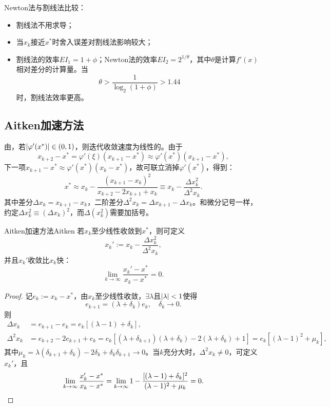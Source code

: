 \begin{remark}
    Newton法与割线法比较：
    \begin{itemize}
        \item 割线法不用求导；
        \item 当$x_k$接近$x^*$时舍入误差对割线法影响较大；
        \item 割线法的效率$EI_1 = 1 + \phi$；Newton法的效率$EI_2 = 2^{1/\theta}$，其中$\theta$是计算$f'(x)$相对差分的计算量。当
        \[
            \theta > \frac1{\log_2(1 + \phi)} > 1.44
        \]
        时，割线法效率更高。
    \end{itemize}
\end{remark}

\subsection{Aitken加速方法}

由，若$\lvert\varphi'(x^*)\rvert \in (0,1)$，则迭代收敛速度为线性的。由于
\[
    x_{k+2} - x^* = \varphi'(\xi)(x_{k+1} - x^*) \approx \varphi'(x^*)(x_{k+1} - x^*),
\]
下一项$x_{k+1} - x^* \approx \varphi'(x^*)(x_k - x^*)$，故可联立消掉$\varphi'(x^*)$，得到：
\[
    x^* \approx x_k - \frac{(x_{k+1} - x_k)^2}{x_{k+2} - 2x_{k+1} + x_k} \equiv x_k - \frac{\Delta x_k^2}{\Delta^2 x_k}.
\]
其中差分$\Delta x_k = x_{k+1} - x_k$，二阶差分$\Delta^2x_k = \Delta x_{k+1} - \Delta x_k$。和微分记号一样，约定$\Delta x_k^2 \equiv (\Delta x_k)^2$，而$\Delta(x_k^2)$需要加括号。

\begin{theorem}
    {Aitken加速方法}{Aitken}
    若$x_k$至少线性收敛到$x^*$，则可定义
    \begin{equation}
        \label{eqn:Aitken}
        x_k' := x_k - \frac{\Delta x_k^2}{\Delta^2x_k},
    \end{equation}
    并且$x_k'$收敛比$x_k$快：
    \begin{equation}\label{eq:na-aitken-acceleration}
        \lim_{k\to\infty}\frac{x_k' - x^*}{x_k - x^*} = 0.
    \end{equation}
\end{theorem}

\begin{proof}
    记$e_k := x_k - x^*$，由$x_k$至少线性收敛，$\exists\lambda$且$\lvert\lambda\rvert < 1$使得
    \[
        e_{k+1} = (\lambda + \delta_k)e_k,\quad\delta_k \to 0.
    \]
    则
    \begin{align*}
        \Delta x_k &= e_{k+1} - e_k = e_k[(\lambda - 1) + \delta_k],\\
        \Delta^2x_k &= e_{k+2} - 2e_{k+1} + e_k = e_k[(\lambda + \delta_{k+1})(\lambda + \delta_k) - 2(\lambda + \delta_k) + 1] = e_k[(\lambda - 1)^2 + \mu_k],
    \end{align*}
    其中$\mu_k = \lambda(\delta_{k+1} + \delta_k) - 2\delta_k + \delta_k\delta_{k+1} \to 0$。当$k$充分大时，$\Delta^2x_k \neq 0$，可定义$x_k'$，且
    \[
        \lim_{k\to\infty}\frac{x_k' - x^*}{x_k - x^*} = \lim_{k\to\infty}1 - \frac{[(\lambda - 1) + \delta_k]^2}{(\lambda - 1)^2 + \mu_k} = 0.
        \qedhere
    \]
\end{proof}


